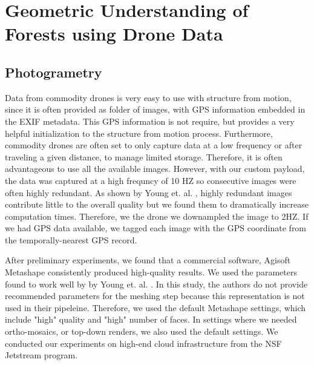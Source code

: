 %
%
%    

\section{Geometric Understanding of Forests using Drone Data}
\subsection{Photogrametry}
Data from commodity drones is very easy to use with structure from motion, since it is often provided as folder of images, with GPS information embedded in the EXIF metadata. This GPS information is not require, but provides a very helpful initialization to the structure from motion process. Furthermore, commodity drones are often set to only capture data at a low frequency or after traveling a given distance, to manage limited storage. Therefore, it is often advantageous to use all the available images. However, with our custom payload, the data was captured at a high frequncy of 10 HZ so consecutive images were often highly redundant. As shown by Young et. al. \cite{Young2022}, highly redundant images contribute little to the overall quality but we found them to dramatically increase computation times. Therefore, we the drone we downampled the image to 2HZ. If we had GPS data available, we tagged each image with the GPS coordinate from the temporally-nearest GPS record.   

After preliminary experiments, we found that a commercial software, Agisoft Metashape consistently produced high-quality results. We used the parameters found to work well by by Young et. al. \cite{Young2022}. In this study, the authors do not provide recommended parameters for the meshing step because this representation is not used in their pipeleine. Therefore, we used the default Metashape settings, which include "high" quality and "high" number of faces. In settings where we needed ortho-mosaics, or top-down renders, we also used the default settings. We conducted our experiments on high-end cloud infrastructure from the NSF Jetstream \cite{} program. 



